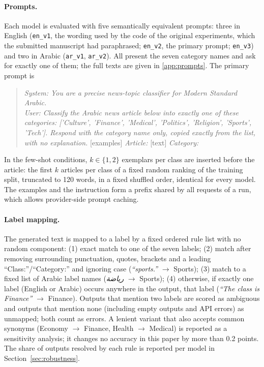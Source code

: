 \documentclass[preprint,12pt,authoryear]{elsarticle}
\newcommand{\RTL}[1]{\foreignlanguage{arabic}{#1}}
\newif\ifrevmarkup
\DeclareRobustCommand{\rev}[1]{\ifrevmarkup{\color{blue}#1}\else#1\fi}
\begin{document}
\paragraph{\rev{Prompts.}} \rev{Each model is evaluated with five semantically equivalent prompts: three in English (\texttt{en\_v1}, the wording used by the code of the original experiments, which the submitted manuscript had paraphrased; \texttt{en\_v2}, the primary prompt; \texttt{en\_v3}) and two in Arabic (\texttt{ar\_v1}, \texttt{ar\_v2}). All present the seven category names and ask for exactly one of them; the full texts are given in \ref{app:prompts}. The primary prompt is}
\begin{quote}\small
\rev{\textit{System: You are a precise news-topic classifier for Modern Standard Arabic.}} \\
\rev{\textit{User: Classify the Arabic news article below into exactly one of these categories: ['Culture', 'Finance', 'Medical', 'Politics', 'Religion', 'Sports', 'Tech']. Respond with the category name only, copied exactly from the list, with no explanation.} [examples] \textit{Article:} [text] \textit{Category:}}
\end{quote}
\rev{In the few-shot conditions, $k\in\{1,2\}$ exemplars per class are inserted before the article: the first $k$ articles per class of a fixed random ranking of the training split, truncated to 120 words, in a fixed shuffled order, identical for every model. The examples and the instruction form a prefix shared by all requests of a run, which allows provider-side prompt caching.}

\paragraph{\rev{Label mapping.}} \rev{The generated text is mapped to a label by a fixed ordered rule list with no random component: (1) exact match to one of the seven labels; (2) match after removing surrounding punctuation, quotes, brackets and a leading ``Class:''/``Category:'' and ignoring case (\textit{``sports.''} $\to$ Sports); (3) match to a fixed list of Arabic label names (\textit{\RTL{رياضة}} $\to$ Sports); (4) otherwise, if exactly one label (English or Arabic) occurs anywhere in the output, that label (\textit{``The class is Finance''} $\to$ Finance). Outputs that mention two labels are scored as ambiguous and outputs that mention none (including empty outputs and API errors) as unmapped; both count as errors. A lenient variant that also accepts common synonyms (Economy $\to$ Finance, Health $\to$ Medical) is reported as a sensitivity analysis; it changes no accuracy in this paper by more than 0.2 points. The share of outputs resolved by each rule is reported per model in Section~\ref{sec:robustness}.}
\end{document}
